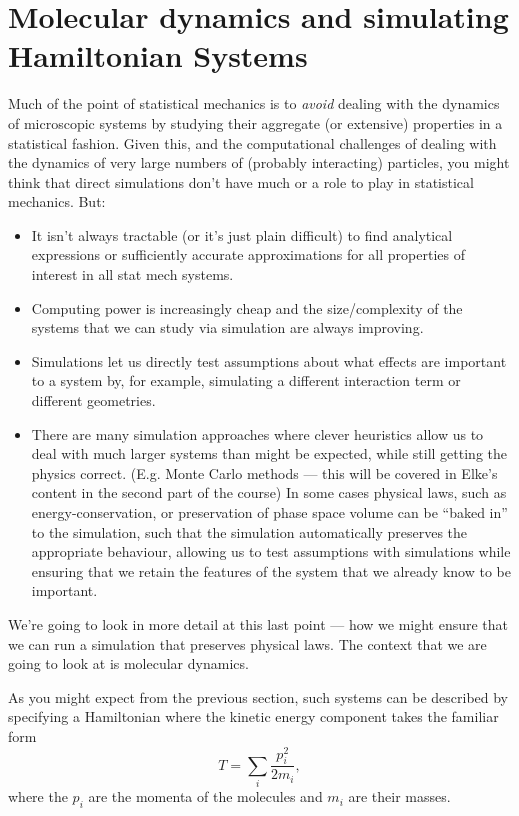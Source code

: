 \section{Molecular dynamics and simulating Hamiltonian Systems}

Much of the point of statistical mechanics is to \emph{avoid} dealing with the dynamics of microscopic systems by studying their aggregate (or extensive) properties in a statistical fashion. Given this, and the computational challenges of dealing with the dynamics of very large numbers of (probably interacting) particles, you might think that direct simulations don't have much or a role to play in statistical mechanics. But:
\begin{itemize}
	\item It isn't always tractable (or it's just plain difficult) to find analytical expressions or sufficiently accurate approximations for all properties of interest in all stat mech systems.
	\item Computing power is increasingly cheap and the size/complexity of the systems that we can study via simulation are always improving.
	\item Simulations let us directly test assumptions about what effects are important to a system by, for example, simulating a different interaction term or different geometries.
	\item There are many simulation approaches where clever heuristics allow us to deal with much larger systems than might be expected, while still getting the physics correct. (E.g. Monte Carlo methods --- this will be covered in Elke's content in the second part of the course) In some cases physical laws, such as energy-conservation, or preservation of phase space volume can be ``baked in'' to the simulation, such that the simulation automatically preserves the appropriate behaviour, allowing us to test assumptions with simulations while ensuring that we retain the features of the system that we already know to be important.
\end{itemize}

We're going to look in more detail at this last point --- how we might ensure that we can run a simulation that preserves physical laws. The context that we are going to look at is molecular dynamics.

As you might expect from the previous section, such systems can be described by specifying a Hamiltonian where the kinetic energy component takes the familiar form
$$ T = \sum_i \frac{{p}_i^2}{2m_i},$$
where the $p_i$ are the momenta of the molecules and $m_i$ are their masses.

